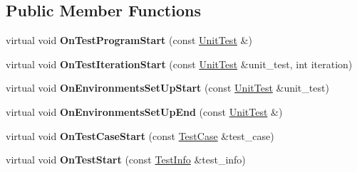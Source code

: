 \subsection*{Public Member Functions}
\begin{DoxyCompactItemize}
\item 
\mbox{\label{classtesting_1_1internal_1_1_pretty_unit_test_result_printer_a7a6b6de195b4ef3c9f2edd2e6c270f3e}} 
virtual void {\bfseries On\+Test\+Program\+Start} (const \hyperlink{classtesting_1_1_unit_test}{Unit\+Test} \&)
\item 
\mbox{\label{classtesting_1_1internal_1_1_pretty_unit_test_result_printer_abdba10a8c97e272ab4cee97cb652c957}} 
virtual void {\bfseries On\+Test\+Iteration\+Start} (const \hyperlink{classtesting_1_1_unit_test}{Unit\+Test} \&unit\+\_\+test, int iteration)
\item 
\mbox{\label{classtesting_1_1internal_1_1_pretty_unit_test_result_printer_a846a5e82b421e04fcdd2b1b2b64b162f}} 
virtual void {\bfseries On\+Environments\+Set\+Up\+Start} (const \hyperlink{classtesting_1_1_unit_test}{Unit\+Test} \&unit\+\_\+test)
\item 
\mbox{\label{classtesting_1_1internal_1_1_pretty_unit_test_result_printer_aadba892f02606a8b0c5f5982b3553aac}} 
virtual void {\bfseries On\+Environments\+Set\+Up\+End} (const \hyperlink{classtesting_1_1_unit_test}{Unit\+Test} \&)
\item 
\mbox{\label{classtesting_1_1internal_1_1_pretty_unit_test_result_printer_adcb68c729565d4bcdf8418a52902c3de}} 
virtual void {\bfseries On\+Test\+Case\+Start} (const \hyperlink{classtesting_1_1_test_case}{Test\+Case} \&test\+\_\+case)
\item 
\mbox{\label{classtesting_1_1internal_1_1_pretty_unit_test_result_printer_a5078ee71cfa97e37ae7a9366149195c5}} 
virtual void {\bfseries On\+Test\+Start} (const \hyperlink{classtesting_1_1_test_info}{Test\+Info} \&test\+\_\+info)

\end{DoxyCompactItemize}
